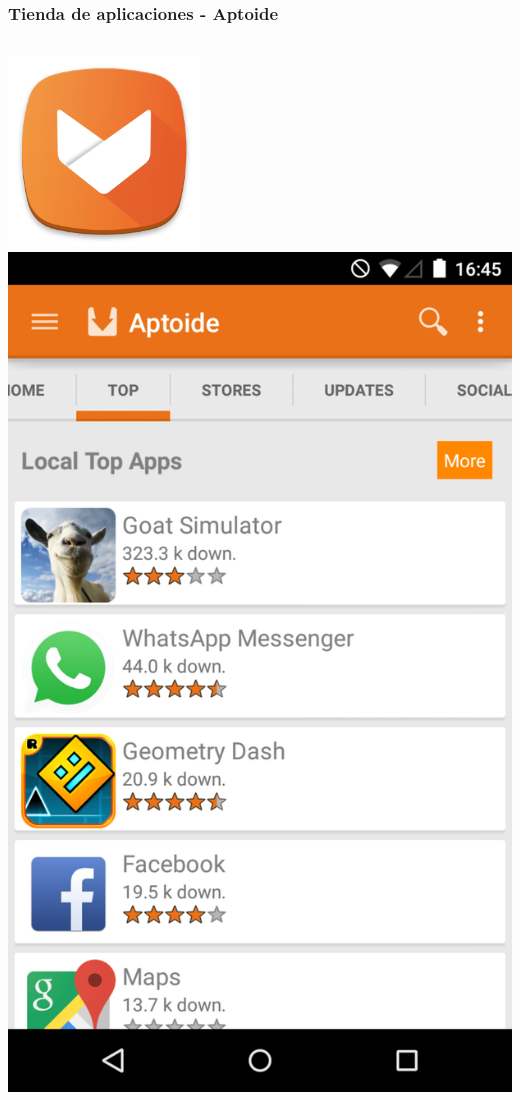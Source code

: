 \begin{frame}

    \frametitle{Tienda de aplicaciones - Aptoide}

    \begin{columns}[c]
            \begin{center}
                \includegraphics[height=0.15\textheight]{images/aptoide-logo.png}
                \includegraphics[height=0.5\textheight]{images/aptoide-screencap.png}

\end{center}
\end{columns}
\end{frame}
